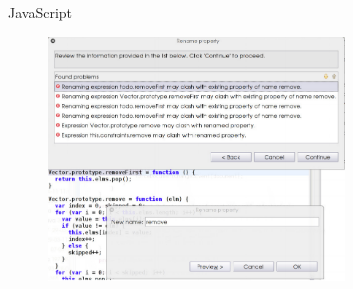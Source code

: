 \documentclass[xcolor=dvipsnames, 14pt]{beamer}
\begin{document}
\begin{frame}{JavaScript}
  \begin{figure}[htbp]
    \centering
    \includegraphics[width=0.7\textwidth]{img/Javascript.png}
    \label{fig:JavaScript}
  \end{figure}
\end{frame}


\end{document}
